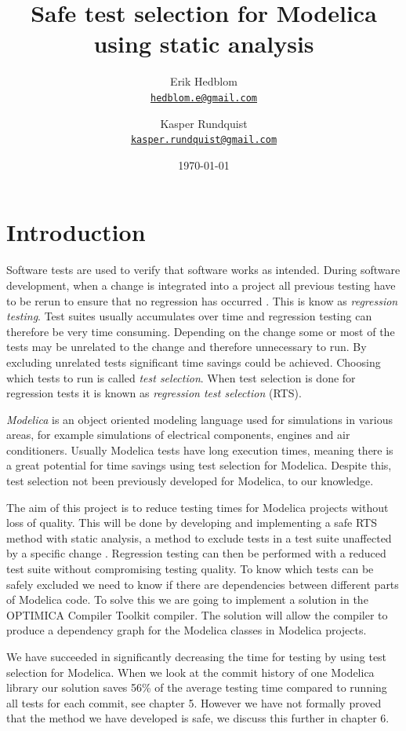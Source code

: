 \documentclass{cslthse-msc}
\author{
	Erik Hedblom \\
	{\normalsize \href{mailto:hedblom.e@gmail.com}{\texttt{hedblom.e@gmail.com}}}
	\and
	Kasper Rundquist \\
	{\normalsize \href{mailto:kasper.rundquist@gmail.com}{\texttt{kasper.rundquist@gmail.com}}}
}
\title{Safe test selection for Modelica using static analysis}
\date{\today}
\begin{document}
\makefrontmatter
\chapter[Introduction]{Introduction}
Software tests are used to verify that software works as intended.
During software development, when a change is integrated into a project all previous testing have to be rerun to ensure that no regression has occurred \cite{DBLP:conf/sigsoft/LegunsenHSLZM16, haider2016safe}. This is know as \emph{regression testing}. Test suites usually accumulates over time and regression testing can therefore be very time consuming. Depending on the change some or most of the tests may be unrelated to the change and therefore unnecessary to run. By excluding unrelated tests significant time savings could be achieved. Choosing which tests to run is called \emph{test selection}. When test selection is done for regression tests it is known as \emph{regression test selection} (RTS).

\emph{Modelica} is an object oriented modeling language used for simulations in various areas, for example simulations of electrical components, engines and air conditioners. Usually Modelica tests have long execution times, meaning there is a great potential for time savings using test selection for Modelica. Despite this, test selection not been previously developed for Modelica, to our knowledge.

The aim of this project is to reduce testing times for Modelica projects without loss of quality. This will be done by developing and implementing a safe RTS method with static analysis, a method to exclude tests in a test suite unaffected by a specific change \cite{DBLP:conf/pppj/OqvistHM16}. Regression testing can then be performed with a reduced test suite without compromising testing quality. To know which tests can be safely excluded we need to know if there are dependencies between different parts of Modelica code. To solve this we are going to implement a solution in the OPTIMICA Compiler Toolkit compiler. The solution will allow the compiler to produce a dependency graph for the Modelica classes in Modelica projects.

We have succeeded in significantly decreasing the time for testing by using test selection for Modelica. When we look at the commit history of one Modelica library our solution saves 56\% of the average testing time compared to running all tests for each commit, see chapter 5. However we have not formally proved that the method we have developed is safe, we discuss this further in chapter 6.
\end{document}
